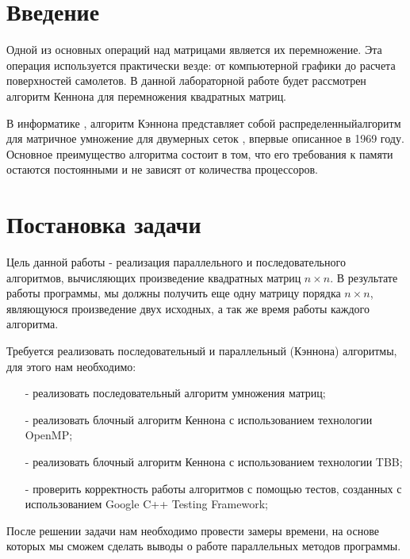 \documentclass{report}
\begin{document}
\setcounter{page}{2}

\tableofcontents
\newpage

\section*{Введение}
Одной из основных операций над матрицами является их перемножение. Эта операция используется практически везде: от компьютерной графики до расчета поверхностей самолетов. В данной лабораторной работе будет рассмотрен алгоритм Кеннона для перемножения квадратных матриц.
\par В информатике , алгоритм Кэннона представляет собой распределенныйалгоритм для матричное умножение для двумерных сеток , впервые описанное в 1969 году. Основное преимущество алгоритма состоит в том, что его требования к памяти остаются постоянными и не зависят от количества процессоров.
\newpage

\section*{Постановка задачи}
Цель данной работы - реализация параллельного и последовательного алгоритмов, вычисляющих произведение квадратных матриц {\itshape $n \times n$}. В результате работы программы, мы должны получить еще одну матрицу порядка {\itshape $n \times n$}, являющуюся произведение двух исходных, а так же время работы каждого алгоритма.

\par Требуется реализовать последовательный и параллельный (Кэннона) алгоритмы, для этого нам необходимо:

\begin{itemize}
    \item[-] реализовать последовательный алгоритм умножения матриц;
    \item[-] реализовать блочный алгоритм Кеннона с использованием технологии OpenMP;
    \item[-] реализовать блочный алгоритм Кеннона с использованием технологии TBB;
    \item[-] проверить корректность работы алгоритмов с помощью тестов, созданных с использованием Google C++ Testing Framework;
\end{itemize}
\par После решении задачи нам необходимо провести замеры времени, на основе которых мы сможем сделать выводы о работе параллельных методов программы.
\newpage
\end{document}
